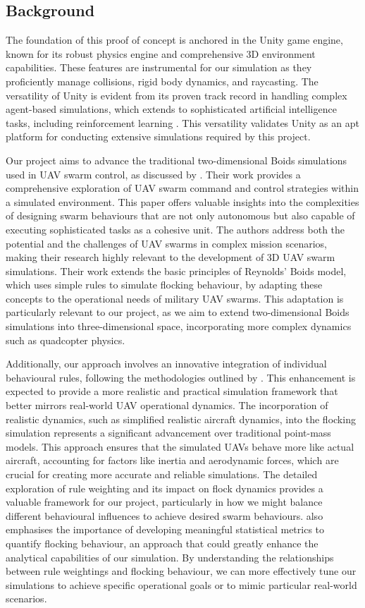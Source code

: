 \documentclass[12pt]{article}
\begin{document}
\subsection{Background}

The foundation of this proof of concept is anchored in the Unity game engine, known for its robust physics engine and comprehensive 3D environment capabilities. These features are instrumental for our simulation as they proficiently manage collisions, rigid body dynamics, and raycasting. The versatility of Unity is evident from its proven track record in handling complex agent-based simulations, which extends to sophisticated artificial intelligence tasks, including reinforcement learning \cite{juliani2020unity}. This versatility validates Unity as an apt platform for conducting extensive simulations required by this project.

Our project aims to advance the traditional two-dimensional Boids simulations used in UAV swarm control, as discussed by \citet{madey2013design}. Their work provides a comprehensive exploration of UAV swarm command and control strategies within a simulated environment. This paper offers valuable insights into the complexities of designing swarm behaviours that are not only autonomous but also capable of executing sophisticated tasks as a cohesive unit. The authors address both the potential and the challenges of UAV swarms in complex mission scenarios, making their research highly relevant to the development of 3D UAV swarm simulations. Their work extends the basic principles of Reynolds' Boids model, which uses simple rules to simulate flocking behaviour, by adapting these concepts to the operational needs of military UAV swarms. This adaptation is particularly relevant to our project, as we aim to extend two-dimensional Boids simulations into three-dimensional space, incorporating more complex dynamics such as quadcopter physics. 

Additionally, our approach involves an innovative integration of individual behavioural rules, following the methodologies outlined by \citet{watson}. This enhancement is expected to provide a more realistic and practical simulation framework that better mirrors real-world UAV operational dynamics. The incorporation of realistic dynamics, such as simplified realistic aircraft dynamics, into the flocking simulation represents a significant advancement over traditional point-mass models. This approach ensures that the simulated UAVs behave more like actual aircraft, accounting for factors like inertia and aerodynamic forces, which are crucial for creating more accurate and reliable simulations. The detailed exploration of rule weighting and its impact on flock dynamics provides a valuable framework for our project, particularly in how we might balance different behavioural influences to achieve desired swarm behaviours. \citet{watson} also emphasises the importance of developing meaningful statistical metrics to quantify flocking behaviour, an approach that could greatly enhance the analytical capabilities of our simulation. By understanding the relationships between rule weightings and flocking behaviour, we can more effectively tune our simulations to achieve specific operational goals or to mimic particular real-world scenarios.
\end{document}
